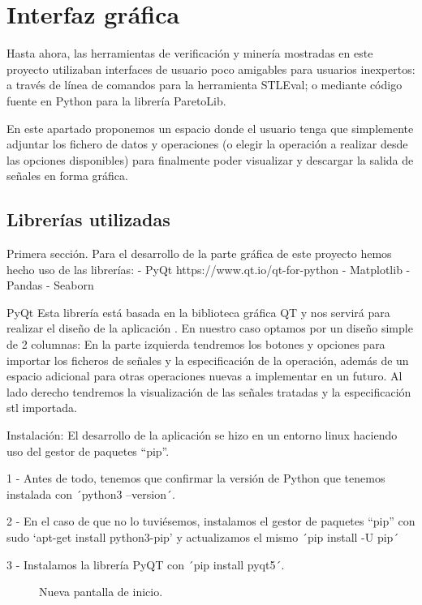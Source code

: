 \chapter{Interfaz gráfica}
\label{cha:gui}
 
Hasta ahora, las herramientas de verificación y minería mostradas en este proyecto utilizaban interfaces de usuario poco amigables para usuarios inexpertos: a través de línea de comandos para la herramienta STLEval; o mediante código fuente en Python para la librería ParetoLib.

En este apartado proponemos un espacio donde el usuario tenga que simplemente adjuntar los fichero de datos y operaciones (o elegir la operación a realizar desde las opciones disponibles) para finalmente poder visualizar y descargar la salida de señales en forma gráfica.
 
\section{Librerías utilizadas}
Primera sección.
Para el desarrollo de la parte gráfica de este proyecto hemos hecho uso de las librerías:
- PyQt https://www.qt.io/qt-for-python
- Matplotlib
- Pandas
- Seaborn 
 
PyQt
Esta librería está basada en la biblioteca gráfica QT y nos servirá para realizar el diseño de la aplicación    . En nuestro caso optamos por un diseño simple de 2 columnas: En la parte izquierda tendremos los botones y opciones para importar los ficheros de señales y la especificación de la operación, además de un espacio adicional para otras operaciones nuevas a implementar en un futuro. Al lado derecho tendremos la visualización de las señales tratadas y la especificación stl importada.
 
Instalación: 
El desarrollo de la aplicación se hizo en un entorno linux haciendo uso del gestor de paquetes “pip”. 
 
1 - Antes de todo, tenemos que confirmar la versión de Python que tenemos instalada con ´python3 --version´.
 
2 - En el caso de que no lo tuviésemos, instalamos el gestor de paquetes “pip” con sudo ‘apt-get install python3-pip’ y actualizamos el mismo ´pip install -U pip´ 
 
3 - Instalamos la librería PyQT con ´pip install pyqt5´. 
 
\begin{figure}
\centering
\caption{Nueva pantalla de inicio.}
\label{fig:senal}
\end{figure}
 
